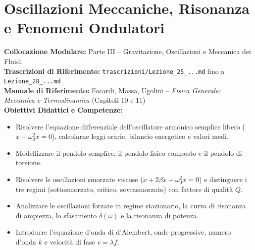\chapter{Oscillazioni Meccaniche, Risonanza e Fenomeni Ondulatori}
\label{chap:oscillazioni_onde}

\begin{tcolorbox}[enhanced, breakable, colback=navyblue!4!white, colframe=navyblue!80!black,
    coltitle=white, fonttitle=\bfseries\sffamily, title={Quadro Sinottico del Capitolo 10 (Corrispondenza: Lezioni 25, 26, 27 e 28)},
    sharp corners, rounded corners=south, boxrule=1pt]
\textbf{Collocazione Modulare:} Parte III -- Gravitazione, Oscillazioni e Meccanica dei Fluidi\\
\textbf{Trascrizioni di Riferimento:} \texttt{trascrizioni/Lezione\_25\_...md} fino a \texttt{Lezione\_28\_...md}\\
\textbf{Manuale di Riferimento:} Focardi, Massa, Ugolini -- \emph{Fisica Generale: Meccanica e Termodinamica} (Capitoli 10 e 11)\\
\textbf{Obiettivi Didattici e Competenze:}\par
\begin{itemize}
    \item Risolvere l'equazione differenziale dell'oscillatore armonico semplice libero ($\ddot{x} + \omega_0^2 x = 0$), calcolarne leggi orarie, bilancio energetico e valori medi.
    \item Modellizzare il pendolo semplice, il pendolo fisico composto e il pendolo di torsione.
    \item Risolvere le oscillazioni smorzate viscose ($\ddot{x} + 2\beta\dot{x} + \omega_0^2 x = 0$) e distinguere i tre regimi (sottosmorzato, critico, sovrasmorzato) con fattore di qualità $Q$.
    \item Analizzare le oscillazioni forzate in regime stazionario, la curva di risonanza di ampiezza, lo sfasamento $\delta(\omega)$ e la risonanza di potenza.
    \item Introdurre l'equazione d'onda di d'Alembert, onde progressive, numero d'onda $k$ e velocità di fase $v = \lambda f$.
\end{itemize}
\end{tcolorbox}

\vspace{0.5em}

